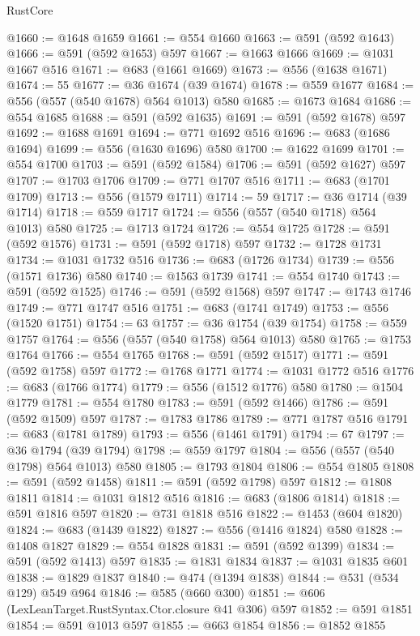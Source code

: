 \begin{lexlean}{RustCore}
\begin{coremodule}
@1660 := @1648 @1659
@1661 := @554 @1660
@1663 := @591 (@592 @1643)
@1666 := @591 (@592 @1653) @597
@1667 := @1663 @1666
@1669 := @1031 @1667 @516
@1671 := @683 (@1661 @1669)
@1673 := @556 (@1638 @1671)
@1674 := 55
@1677 := @36 @1674 (@39 @1674)
@1678 := @559 @1677
@1684 := @556 (@557 (@540 @1678) @564 @1013) @580
@1685 := @1673 @1684
@1686 := @554 @1685
@1688 := @591 (@592 @1635)
@1691 := @591 (@592 @1678) @597
@1692 := @1688 @1691
@1694 := @771 @1692 @516
@1696 := @683 (@1686 @1694)
@1699 := @556 (@1630 @1696) @580
@1700 := @1622 @1699
@1701 := @554 @1700
@1703 := @591 (@592 @1584)
@1706 := @591 (@592 @1627) @597
@1707 := @1703 @1706
@1709 := @771 @1707 @516
@1711 := @683 (@1701 @1709)
@1713 := @556 (@1579 @1711)
@1714 := 59
@1717 := @36 @1714 (@39 @1714)
@1718 := @559 @1717
@1724 := @556 (@557 (@540 @1718) @564 @1013) @580
@1725 := @1713 @1724
@1726 := @554 @1725
@1728 := @591 (@592 @1576)
@1731 := @591 (@592 @1718) @597
@1732 := @1728 @1731
@1734 := @1031 @1732 @516
@1736 := @683 (@1726 @1734)
@1739 := @556 (@1571 @1736) @580
@1740 := @1563 @1739
@1741 := @554 @1740
@1743 := @591 (@592 @1525)
@1746 := @591 (@592 @1568) @597
@1747 := @1743 @1746
@1749 := @771 @1747 @516
@1751 := @683 (@1741 @1749)
@1753 := @556 (@1520 @1751)
@1754 := 63
@1757 := @36 @1754 (@39 @1754)
@1758 := @559 @1757
@1764 := @556 (@557 (@540 @1758) @564 @1013) @580
@1765 := @1753 @1764
@1766 := @554 @1765
@1768 := @591 (@592 @1517)
@1771 := @591 (@592 @1758) @597
@1772 := @1768 @1771
@1774 := @1031 @1772 @516
@1776 := @683 (@1766 @1774)
@1779 := @556 (@1512 @1776) @580
@1780 := @1504 @1779
@1781 := @554 @1780
@1783 := @591 (@592 @1466)
@1786 := @591 (@592 @1509) @597
@1787 := @1783 @1786
@1789 := @771 @1787 @516
@1791 := @683 (@1781 @1789)
@1793 := @556 (@1461 @1791)
@1794 := 67
@1797 := @36 @1794 (@39 @1794)
@1798 := @559 @1797
@1804 := @556 (@557 (@540 @1798) @564 @1013) @580
@1805 := @1793 @1804
@1806 := @554 @1805
@1808 := @591 (@592 @1458)
@1811 := @591 (@592 @1798) @597
@1812 := @1808 @1811
@1814 := @1031 @1812 @516
@1816 := @683 (@1806 @1814)
@1818 := @591 @1816 @597
@1820 := @731 @1818 @516
@1822 := @1453 (@604 @1820)
@1824 := @683 (@1439 @1822)
@1827 := @556 (@1416 @1824) @580
@1828 := @1408 @1827
@1829 := @554 @1828
@1831 := @591 (@592 @1399)
@1834 := @591 (@592 @1413) @597
@1835 := @1831 @1834
@1837 := @1031 @1835 @601
@1838 := @1829 @1837
@1840 := @474 (@1394 @1838)
@1844 := @531 (@534 @129) @549 @964
@1846 := @585 (@660 @300)
@1851 := @606 (LexLeanTarget.RustSyntax.Ctor.closure @41 @306) @597
@1852 := @591 @1851
@1854 := @591 @1013 @597
@1855 := @663 @1854
@1856 := @1852 @1855

\end{coremodule}
\end{lexlean}
